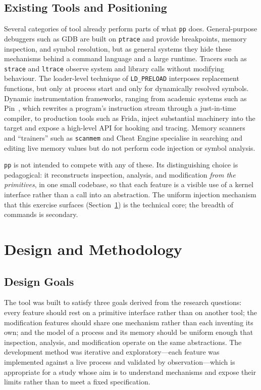 \documentclass[10pt,twocolumn,a4paper]{article}
\begin{document}
\subsection{Existing Tools and Positioning}
Several categories of tool already perform parts of what \texttt{pp} does.
General-purpose debuggers such as GDB are built on \texttt{ptrace} and provide
breakpoints, memory inspection, and symbol resolution, but as general systems
they hide these mechanisms behind a command language and a large runtime.
Tracers such as \texttt{strace} and \texttt{ltrace} observe system and library
calls without modifying behaviour. The loader-level technique of
\texttt{LD\_PRELOAD} interposes replacement functions, but only at process
start and only for dynamically resolved symbols. Dynamic instrumentation
frameworks, ranging from academic systems such as Pin~\cite{pin}, which rewrites
a program's instruction stream through a just-in-time compiler, to production
tools such as Frida, inject substantial machinery into the target and expose a
high-level API for hooking and tracing. Memory scanners and ``trainers''
such as \texttt{scanmem} and Cheat Engine specialise in searching and editing
live memory values but do not perform code injection or symbol analysis.

\texttt{pp} is not intended to compete with any of these. Its distinguishing
choice is pedagogical: it reconstructs inspection, analysis, and modification
\emph{from the primitives}, in one small codebase, so that each feature is a
visible use of a kernel interface rather than a call into an abstraction. The
uniform injection mechanism that this exercise surfaces (Section~\ref{sec:design})
is the technical core; the breadth of commands is secondary.

\section{Design and Methodology}\label{sec:design}

\subsection{Design Goals}
The tool was built to satisfy three goals derived from the research questions:
every feature should rest on a primitive interface rather than on another tool;
the modification features should share one mechanism rather than each inventing
its own; and the model of a process and its memory should be uniform enough that
inspection, analysis, and modification operate on the same abstractions. The
development method was iterative and exploratory---each feature was implemented
against a live process and validated by observation---which is appropriate for a
study whose aim is to understand mechanisms and expose their limits rather than
to meet a fixed specification.
\end{document}
